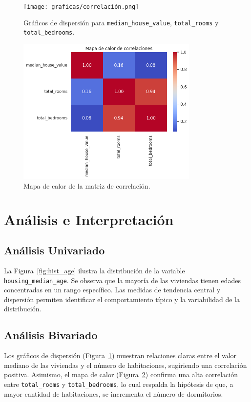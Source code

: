\documentclass[a4paper, 10pt]{article}
\begin{document}
\begin{figure}[ht]
\centering
\texttt{[image: graficas/correlación.png]}
\caption{Gráficos de dispersión para \texttt{median\_house\_value}, \texttt{total\_rooms} y \texttt{total\_bedrooms}.}
\label{fig:dispersion}
\end{figure}

\begin{figure}[ht]
\centering
\includegraphics[width=0.8\textwidth]{graficas/mapacalor.png}
\caption{Mapa de calor de la matriz de correlación.}
\label{fig:heatmap}
\end{figure}

\section{Análisis e Interpretación}\label{s:5}
\subsection{Análisis Univariado}
La Figura~\ref{fig:hist_age} ilustra la distribución de la variable \texttt{housing\_median\_age}. Se observa que la mayoría de las viviendas tienen edades concentradas en un rango específico. Las medidas de tendencia central y dispersión permiten identificar el comportamiento típico y la variabilidad de la distribución.

\subsection{Análisis Bivariado}
Los gráficos de dispersión (Figura~\ref{fig:dispersion}) muestran relaciones claras entre el valor mediano de las viviendas y el número de habitaciones, sugiriendo una correlación positiva. Asimismo, el mapa de calor (Figura~\ref{fig:heatmap}) confirma una alta correlación entre \texttt{total\_rooms} y \texttt{total\_bedrooms}, lo cual respalda la hipótesis de que, a mayor cantidad de habitaciones, se incrementa el número de dormitorios.
\end{document}
